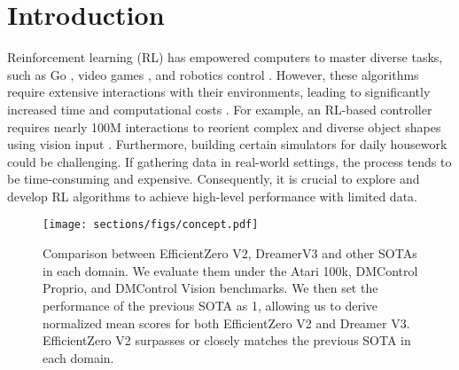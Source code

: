 \section{Introduction}
\label{intro}
Reinforcement learning (RL) has empowered computers to master diverse tasks, such as Go \citep{silver2018general}, video games \citep{ye2021mastering}, and robotics control \cite{hwangbo2019learning,andrychowicz2020learning,akkaya2019solving}. 
However, these algorithms require extensive interactions with their environments, leading to significantly increased time and computational costs \citep{petrenko2023dexpbt,chen2022system}. 
For example, an RL-based controller requires nearly 100M interactions to reorient complex and diverse object shapes using vision input \cite{chen2023visual}.
Furthermore, building certain simulators for daily housework could be challenging. If gathering data in real-world settings, the process tends to be time-consuming and expensive.
Consequently, it is crucial to explore and develop RL algorithms to achieve high-level performance with limited data.


\begin{figure}[t]
\centering
\texttt{[image: sections/figs/concept.pdf]}
\caption{Comparison between EfficientZero V2, DreamerV3 and other SOTAs in each domain. We evaluate them under the Atari 100k, DMControl Proprio, and DMControl Vision benchmarks. 
We then set the performance of the previous SOTA as 1, allowing us to derive normalized mean scores for both EfficientZero V2 and Dreamer V3. EfficientZero V2 surpasses or closely matches the previous SOTA in each domain.}
\label{main_sell}
\end{figure}



